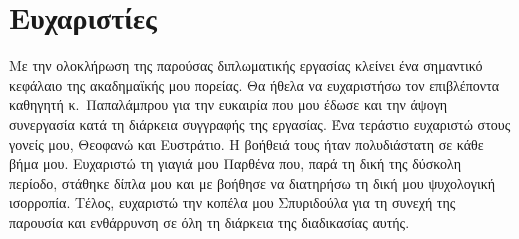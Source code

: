 \chapter*{Ευχαριστίες}

Με την ολοκλήρωση της παρούσας διπλωματικής εργασίας κλείνει ένα σημαντικό
κεφάλαιο της ακαδημαϊκής μου πορείας. Θα ήθελα να ευχαριστήσω τον επιβλέποντα
καθηγητή κ.~Παπαλάμπρου για την ευκαιρία που μου έδωσε και την άψογη συνεργασία
κατά τη διάρκεια συγγραφής της εργασίας. Ένα τεράστιο ευχαριστώ στους γονείς
μου, Θεοφανώ και Ευστράτιο. Η βοήθειά τους ήταν πολυδιάστατη σε κάθε βήμα μου.
Ευχαριστώ τη γιαγιά μου Παρθένα που, παρά τη δική της δύσκολη περίοδο, στάθηκε
δίπλα μου και με βοήθησε να διατηρήσω τη δική μου ψυχολογική ισορροπία. Τέλος,
ευχαριστώ την κοπέλα μου Σπυριδούλα για τη συνεχή της παρουσία και ενθάρρυνση
σε όλη τη διάρκεια της διαδικασίας αυτής.